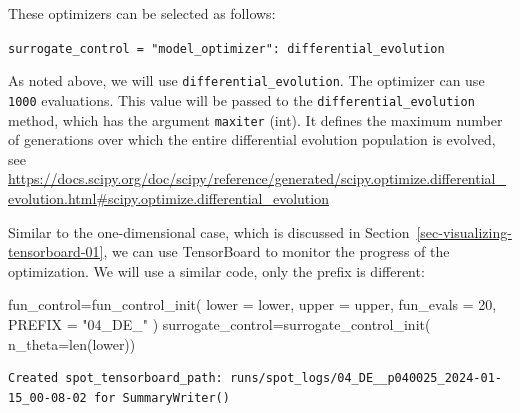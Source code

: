 \documentclass[
  letterpaper,
  DIV=11,
  numbers=noendperiod]{scrreprt}
\newenvironment{Shaded}{\begin{snugshade}}{\end{snugshade}}
\newcommand{\BuiltInTok}[1]{\textcolor[rgb]{0.00,0.23,0.31}{#1}}
\newcommand{\DecValTok}[1]{\textcolor[rgb]{0.68,0.00,0.00}{#1}}
\newcommand{\NormalTok}[1]{\textcolor[rgb]{0.00,0.23,0.31}{#1}}
\newcommand{\OperatorTok}[1]{\textcolor[rgb]{0.37,0.37,0.37}{#1}}
\newcommand{\StringTok}[1]{\textcolor[rgb]{0.13,0.47,0.30}{#1}}
\begin{document}
These optimizers can be selected as follows:

\texttt{surrogate\_control\ =\ "model\_optimizer":\ differential\_evolution}

As noted above, we will use \texttt{differential\_evolution}. The
optimizer can use \texttt{1000} evaluations. This value will be passed
to the \texttt{differential\_evolution} method, which has the argument
\texttt{maxiter} (int). It defines the maximum number of generations
over which the entire differential evolution population is evolved, see
\url{https://docs.scipy.org/doc/scipy/reference/generated/scipy.optimize.differential_evolution.html\#scipy.optimize.differential_evolution}

\begin{tcolorbox}[enhanced jigsaw, rightrule=.15mm, coltitle=black, title=\textcolor{quarto-callout-note-color}{\faInfo}\hspace{0.5em}{TensorBoard}, opacitybacktitle=0.6, bottomrule=.15mm, opacityback=0, left=2mm, colback=white, leftrule=.75mm, colframe=quarto-callout-note-color-frame, colbacktitle=quarto-callout-note-color!10!white, toprule=.15mm, toptitle=1mm, bottomtitle=1mm, titlerule=0mm, breakable, arc=.35mm]

Similar to the one-dimensional case, which is discussed in
Section~\ref{sec-visualizing-tensorboard-01}, we can use TensorBoard to
monitor the progress of the optimization. We will use a similar code,
only the prefix is different:

\begin{Shaded}
\begin{Highlighting}[]
\NormalTok{fun\_control}\OperatorTok{=}\NormalTok{fun\_control\_init(}
\NormalTok{                    lower }\OperatorTok{=}\NormalTok{ lower,}
\NormalTok{                    upper }\OperatorTok{=}\NormalTok{ upper,}
\NormalTok{                    fun\_evals }\OperatorTok{=} \DecValTok{20}\NormalTok{,}
\NormalTok{                    PREFIX }\OperatorTok{=} \StringTok{"04\_DE\_"}
\NormalTok{                    )}
\NormalTok{surrogate\_control}\OperatorTok{=}\NormalTok{surrogate\_control\_init(}
\NormalTok{                    n\_theta}\OperatorTok{=}\BuiltInTok{len}\NormalTok{(lower))}
\end{Highlighting}
\end{Shaded}

\begin{verbatim}
Created spot_tensorboard_path: runs/spot_logs/04_DE__p040025_2024-01-15_00-08-02 for SummaryWriter()
\end{verbatim}

\end{tcolorbox}
\end{document}
